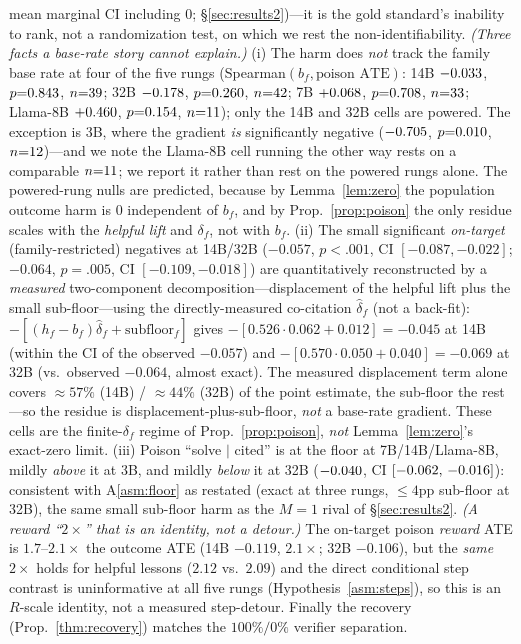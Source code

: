 mean marginal CI including $0$; \S\ref{sec:results2})---it is the gold standard's
inability to rank, not a randomization test, on which we rest the non-identifiability.
\emph{(Three facts a base-rate story cannot explain.)} (i) The harm does \emph{not} track the
family base rate at four of the five rungs (Spearman$(b_f,\text{poison ATE})$: 14B
$-0.033{}$, $p{=}0.843{}$, $n{=}39{}$;
32B $-0.178{}$, $p{=}0.260{}$,
$n{=}42{}$; 7B $+0.068{}$,
$p{=}0.708{}$, $n{=}33{}$; Llama-8B
$+0.460{}$, $p{=}0.154{}$, $n{=}11{}$); only
the 14B and 32B cells are powered. The exception is 3B, where the gradient \emph{is}
significantly negative ($-0.705{}$, $p{=}0.010{}$,
$n{=}12{}$)---and we note the Llama-8B cell running the other way rests
on a comparable $n{=}11{}$; we report it rather than rest on the powered rungs
alone. The powered-rung nulls are predicted, because by Lemma~\ref{lem:zero} the population outcome
harm is $0$ independent of $b_f$, and by Prop.~\ref{prop:poison} the only residue scales
with the \emph{helpful lift} and $\delta_f$, not with $b_f$. (ii) The small significant \emph{on-target} (family-restricted)
negatives at 14B/32B ($-0.057$, $p{<}.001$, CI $[-0.087,-0.022]$; $-0.064$, $p{=}.005$, CI $[-0.109,-0.018]$) are quantitatively
reconstructed by a \emph{measured} two-component decomposition---displacement of the
helpful lift plus the small sub-floor---using the directly-measured co-citation
$\widehat\delta_f$ (not a back-fit): $-[(h_f-b_f)\widehat\delta_f + \mathrm{subfloor}_f]$
gives $-[0.526{\cdot}0.062 + 0.012] = -0.045$ at 14B (within the CI of the observed
$-0.057$) and $-[0.570{\cdot}0.050 + 0.040] = -0.069$ at 32B (vs.\ observed $-0.064$, almost
exact). The measured displacement term alone covers $\approx57\%$ (14B) / $\approx44\%$
(32B) of the point estimate, the sub-floor the rest---so the residue is
displacement-plus-sub-floor, \emph{not} a base-rate gradient. These cells are the
finite-$\delta_f$ regime of Prop.~\ref{prop:poison}, \emph{not} Lemma~\ref{lem:zero}'s
exact-zero limit. (iii) Poison ``solve $\mid$ cited'' is at the
floor at 7B/14B/Llama-8B, mildly \emph{above} it at 3B, and mildly \emph{below} it at
32B ($-0.040{}$, CI
$[-0.062,\,-0.016]{}$): consistent with A\ref{asm:floor} as restated (exact at three rungs,
$\le4$pp sub-floor at 32B), the same small sub-floor harm as the $M{=}1$ rival of
\S\ref{sec:results2}. \emph{(A reward ``$2\times$'' that is an identity, not a detour.)}
The on-target poison \emph{reward} ATE is $1.7$--$2.1\times$ the outcome ATE (14B $-0.119$, $2.1\times$; 32B
$-0.106$), but the \emph{same} $2\times$ holds for helpful lessons ($2.12$ vs.\ $2.09$) and
the direct conditional step contrast is uninformative at all five rungs (Hypothesis~\ref{asm:steps}), so
this is an $R$-scale identity, not a measured step-detour. Finally the recovery
(Prop.~\ref{thm:recovery}) matches the $100\%/0\%$ verifier separation.

